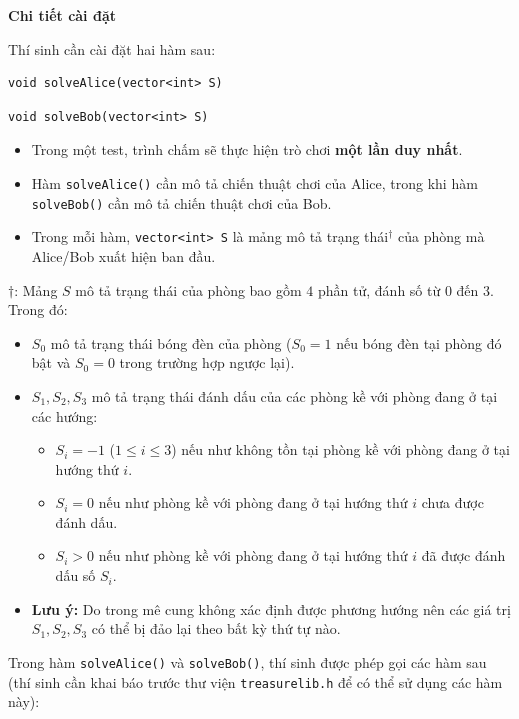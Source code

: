 \textbf{Chi tiết cài đặt}

Thí sinh cần cài đặt hai hàm sau:

\begin{lstlisting}
void solveAlice(vector<int> S)
\end{lstlisting}

\begin{lstlisting}
void solveBob(vector<int> S)
\end{lstlisting}

\begin{itemize}
   \item Trong một test, trình chấm sẽ thực hiện trò chơi \textbf{một lần duy nhất}.
   \item Hàm \texttt{solveAlice()} cần mô tả chiến thuật chơi của Alice, trong khi hàm \texttt{solveBob()} cần mô tả chiến thuật chơi của Bob.
   \item Trong mỗi hàm, \texttt{vector<int> S} là mảng mô tả trạng thái$^{\dagger}$ của phòng mà Alice/Bob xuất hiện ban đầu.
\end{itemize}

$\dagger$: Mảng $S$ mô tả trạng thái của phòng bao gồm $4$ phần tử, đánh số từ $0$ đến $3$. Trong đó:
\begin{itemize}
   \item $S_0$ mô tả trạng thái bóng đèn của phòng ($S_0=1$ nếu bóng đèn tại phòng đó bật và $S_0=0$ trong trường hợp ngược lại).
   \item $S_1,S_2,S_3$ mô tả trạng thái đánh dấu của các phòng kề với phòng đang ở tại các hướng:
   \begin{itemize}
      \item $S_i=-1$ ($1\le i\le 3$) nếu như không tồn tại phòng kề với phòng đang ở tại hướng thứ $i$.
      \item $S_i=0$ nếu như phòng kề với phòng đang ở tại hướng thứ $i$ chưa được đánh dấu.
      \item $S_i>0$ nếu như phòng kề với phòng đang ở tại hướng thứ $i$ đã được đánh dấu số $S_i$.
   \end{itemize}
   \item \textbf{Lưu ý:} Do trong mê cung không xác định được phương hướng nên các giá trị $S_1,S_2,S_3$ có thể bị đảo lại theo bất kỳ thứ tự nào.
\end{itemize}

Trong hàm \texttt{solveAlice()} và \texttt{solveBob()}, thí sinh được phép gọi các hàm sau (thí sinh cần khai báo trước thư viện \texttt{treasurelib.h} để có thể sử dụng các hàm này):

